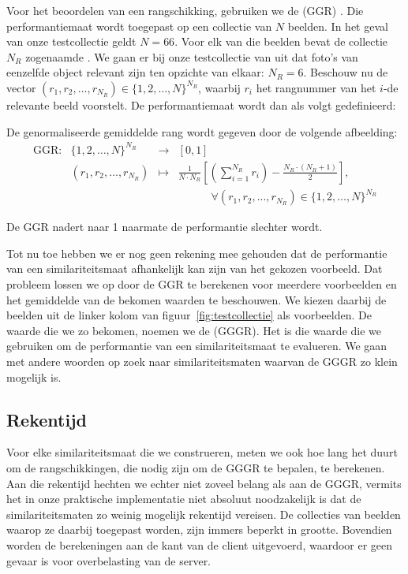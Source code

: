Voor het beoordelen van een rangschikking, gebruiken we de  
(GGR) \cite{muller:perf_eval}. Die performantiemaat wordt toegepast op een collectie
van $N$ beelden. In het geval van onze testcollectie geldt $N = 66$. 
Voor elk van die beelden bevat de collectie $N_R$ zogenaamde . 
We gaan er bij onze testcollectie van uit dat foto's van eenzelfde object relevant zijn ten opzichte
van elkaar: $N_R = 6$. Beschouw nu de vector 
$(r_1,r_2,\ldots,r_{N_R}) \in \{1,2,\ldots,N\}^{N_R}$, waarbij $r_i$ het
rangnummer van het $i$-de relevante beeld voorstelt. De performantiemaat
wordt dan als volgt gedefinieerd:
\begin{definitie}
De genormaliseerde gemiddelde rang wordt gegeven door de volgende afbeelding:
\begin{displaymath}
\begin{array}{lrcl}
\textrm{GGR}: 	& \{1,2,\ldots,N\}^{N_R} & \to 	& [0,1] \\
		& (r_1,r_2,\ldots,r_{N_R}) & \mapsto &
	{\displaystyle\frac{1}{N \cdot N_R}\left[ \left(\sum_{i=1}^{N_R}r_i\right) - \frac{N_R \cdot (N_R + 1)}{2} \right]},\\[15pt]
	& & & \qquad \quad \forall (r_1, r_2, ..., r_{N_R}) \in \{1,2,\ldots,N\}^{N_R}
\end{array}
\end{displaymath}
\end{definitie}
\noindent
De GGR nadert naar 1 naarmate de performantie slechter wordt.

Tot nu toe hebben we er nog geen rekening mee gehouden dat de performantie van
een similariteitsmaat afhankelijk kan zijn van het gekozen voorbeeld. Dat probleem lossen we
op door de GGR te berekenen voor meerdere voorbeelden en het gemiddelde van de bekomen waarden
te beschouwen. We kiezen daarbij de beelden uit de linker kolom van 
figuur~\ref{fig:testcollectie} als voorbeelden. De waarde die we zo bekomen, noemen we de
(GGGR). Het is die waarde die we gebruiken
om de performantie van een similariteitsmaat te evalueren. We gaan met andere woorden op
zoek naar similariteitsmaten waarvan de GGGR zo klein mogelijk is.

\subsection{Rekentijd}
\label{sectie:rekentijd}

Voor elke similariteitsmaat die we construeren, meten we ook hoe lang het duurt om
de rangschikkingen, die nodig zijn om de GGGR te bepalen, te berekenen. Aan die 
rekentijd hechten we echter niet zoveel belang als aan de GGGR, vermits het in onze
praktische implementatie niet absoluut noodzakelijk is dat de similariteitsmaten zo weinig
mogelijk rekentijd vereisen. De collecties van beelden waarop ze daarbij toegepast worden,
zijn immers beperkt in grootte. Bovendien worden de berekeningen aan de kant van de client
uitgevoerd, waardoor er geen gevaar is voor overbelasting van de server.

